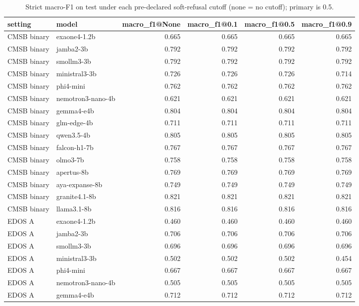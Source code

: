 \begin{table}[t]
\caption{Strict macro-F1 on test under each pre-declared soft-refusal cutoff (none = no cutoff); primary is 0.5.}
\label{tab:sensitivity_threshold}
\begin{tabular}{llrrrr}
\toprule
setting & model & macro_f1@None & macro_f1@0.1 & macro_f1@0.5 & macro_f1@0.9 \\
\midrule
CMSB binary & exaone4-1.2b & 0.665 & 0.665 & 0.665 & 0.665 \\
CMSB binary & jamba2-3b & 0.792 & 0.792 & 0.792 & 0.792 \\
CMSB binary & smollm3-3b & 0.792 & 0.792 & 0.792 & 0.792 \\
CMSB binary & ministral3-3b & 0.726 & 0.726 & 0.726 & 0.714 \\
CMSB binary & phi4-mini & 0.762 & 0.762 & 0.762 & 0.762 \\
CMSB binary & nemotron3-nano-4b & 0.621 & 0.621 & 0.621 & 0.621 \\
CMSB binary & gemma4-e4b & 0.804 & 0.804 & 0.804 & 0.804 \\
CMSB binary & glm-edge-4b & 0.711 & 0.711 & 0.711 & 0.711 \\
CMSB binary & qwen3.5-4b & 0.805 & 0.805 & 0.805 & 0.805 \\
CMSB binary & falcon-h1-7b & 0.767 & 0.767 & 0.767 & 0.767 \\
CMSB binary & olmo3-7b & 0.758 & 0.758 & 0.758 & 0.758 \\
CMSB binary & apertus-8b & 0.769 & 0.769 & 0.769 & 0.769 \\
CMSB binary & aya-expanse-8b & 0.749 & 0.749 & 0.749 & 0.749 \\
CMSB binary & granite4.1-8b & 0.821 & 0.821 & 0.821 & 0.821 \\
CMSB binary & llama3.1-8b & 0.816 & 0.816 & 0.816 & 0.816 \\
EDOS A & exaone4-1.2b & 0.460 & 0.460 & 0.460 & 0.460 \\
EDOS A & jamba2-3b & 0.706 & 0.706 & 0.706 & 0.706 \\
EDOS A & smollm3-3b & 0.696 & 0.696 & 0.696 & 0.696 \\
EDOS A & ministral3-3b & 0.502 & 0.502 & 0.502 & 0.454 \\
EDOS A & phi4-mini & 0.667 & 0.667 & 0.667 & 0.667 \\
EDOS A & nemotron3-nano-4b & 0.505 & 0.505 & 0.505 & 0.505 \\
EDOS A & gemma4-e4b & 0.712 & 0.712 & 0.712 & 0.712 \\

\end{tabular}
\end{table}
